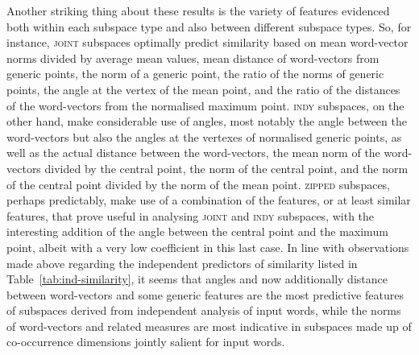 Another striking thing about these results is the variety of features evidenced both within each subspace type and also between different subspace types.  So, for instance, \textsc{joint} subspaces optimally predict similarity based on mean word-vector norms divided by average mean values, mean distance of word-vectors from generic points, the norm of a generic point, the ratio of the norms of generic points, the angle at the vertex of the mean point, and the ratio of the distances of the word-vectors from the normalised maximum point.  \textsc{indy} subspaces, on the other hand, make considerable use of angles, most notably the angle between the word-vectors but also the angles at the vertexes of normalised generic points, as well as the actual distance between the word-vectors, the mean norm of the word-vectors divided by the central point, the norm of the central point, and the norm of the central point divided by the norm of the mean point.  \textsc{zipped} subspaces, perhaps predictably, make use of a combination of the features, or at least similar features, that prove useful in analysing \textsc{joint} and \textsc{indy} subspaces, with the interesting addition of the angle between the central point and the maximum point, albeit with a very low coefficient in this last case.  In line with observations made above regarding the independent predictors of similarity listed in Table~\ref{tab:ind-similarity}, it seems that angles and now additionally distance between word-vectors and some generic features are the most predictive features of subspaces derived from independent analysis of input words, while the norms of word-vectors and related measures are most indicative in subspaces made up of co-occurrence dimensions jointly salient for input words.

